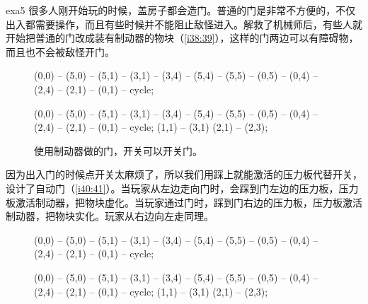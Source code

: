 \begin{example}{}{exa5}
  很多人刚开始玩\termTR 的时候，盖房子都会造门。普通的门是非常不方便的，不仅出入都需要操作，而且有些时候并不能阻止敌怪进入。解救了机械师后，有些人就开始把普通的门改成装有制动器的物块（\autoref{i38:39}），这样的门两边可以有障碍物，而且也不会被敌怪开门。

  \begin{figure}[H]
    \centering
    \begin{tikzpictureC}[TRsch]
       (0,0) -- (5,0) -- (5,1) -- (3,1) -- (3,4) -- (5,4) -- (5,5) -- (0,5) -- (0,4) -- (2,4) -- (2,1) -- (0,1) -- cycle;
    \end{tikzpictureC}%
    \begin{tikzpictureC}[TRsch]
       (0,0) -- (5,0) -- (5,1) -- (3,1) -- (3,4) -- (5,4) -- (5,5) -- (0,5) -- (0,4) -- (2,4) -- (2,1) -- (0,1) -- cycle;
        (1,1) -- (3,1)
        (2,1) -- (2,3);
    \end{tikzpictureC}%
    \caption{使用制动器做的门，开关可以开关门。}
    \label{i38:39}
  \end{figure}

  因为出入门的时候点开关太麻烦了，所以我们用踩上就能激活的压力板代替开关，设计了自动门（\autoref{i40:41}）。当玩家从左边走向门时，会踩到门左边的压力板，压力板激活制动器，把物块虚化。当玩家通过门时，踩到门右边的压力板，压力板激活制动器，把物块实化。玩家从右边向左走同理。

  \begin{figure}[H]
    \centering
    \begin{tikzpictureC}[TRsch]
       (0,0) -- (5,0) -- (5,1) -- (3,1) -- (3,4) -- (5,4) -- (5,5) -- (0,5) -- (0,4) -- (2,4) -- (2,1) -- (0,1) -- cycle;
    \end{tikzpictureC}%
    \begin{tikzpictureC}[TRsch]
       (0,0) -- (5,0) -- (5,1) -- (3,1) -- (3,4) -- (5,4) -- (5,5) -- (0,5) -- (0,4) -- (2,4) -- (2,1) -- (0,1) -- cycle;
        (1,1) -- (3,1)
        (2,1) -- (2,3);
    \end{tikzpictureC}%
    \caption{}
    \label{i40:41}
  \end{figure}


\end{example}
